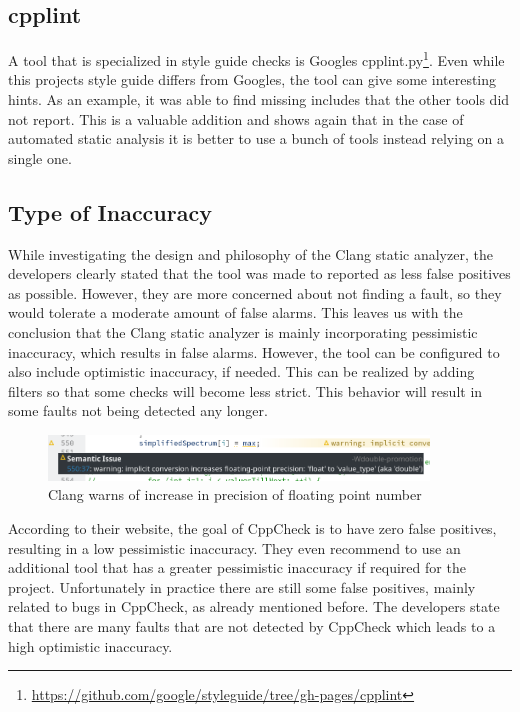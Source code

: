 \documentclass{scrreprt}
\begin{document}
\subsection{cpplint} A tool that is specialized in style guide checks is Googles cpplint.py\footnote{\url{https://github.com/google/styleguide/tree/gh-pages/cpplint}}. Even while this projects style guide differs from Googles, the tool can give some interesting hints. As an example, it was able to find missing includes that the other tools did not report. This is a valuable addition and shows again that in the case of automated static analysis it is better to use a bunch of tools instead relying on a single one.


\subsection{Type of Inaccuracy}


While investigating the design and philosophy of the Clang static analyzer, the developers clearly stated that the tool was made to reported as less false positives as possible. However, they are more concerned about not finding a fault, so they would tolerate a moderate amount of false alarms. This leaves us with the conclusion that the Clang static analyzer is mainly incorporating pessimistic inaccuracy, which results in false alarms. However, the tool can be configured to also include optimistic inaccuracy, if needed. This can be realized by adding filters so that some checks will become less strict. This behavior will result in some faults not being detected any longer.

\begin{figure}[h]
	\centering
	\includegraphics[width=0.9\textwidth]{img/clang_fp_implicit_precision_increase}
	\caption[Clang warns of increase in precision]{Clang warns of increase in precision of floating point number}
	\label{fig:clang_fp_implicit_precision_increase}
\end{figure}

According to their website, the goal of CppCheck is to have zero false positives, resulting in a low pessimistic inaccuracy. They even recommend to use an additional tool that has a greater pessimistic inaccuracy if required for the project. Unfortunately in practice there are still some false positives, mainly related to bugs in CppCheck, as already mentioned before. The developers state that there are many faults that are not detected by CppCheck which leads to a high optimistic inaccuracy.
\end{document}
